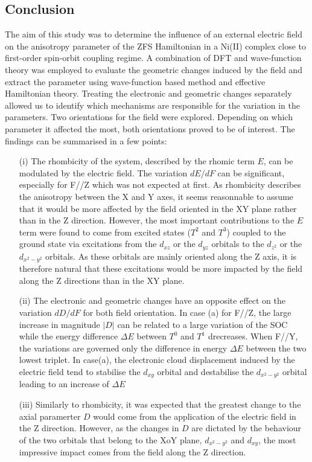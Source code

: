 \documentclass[10pt]{report}
\numberwithin{equation}{section}
\begin{document}
\newpage
\subsection{Conclusion}

The aim of this study was to determine the influence of an external electric field on the anisotropy parameter of the ZFS Hamiltonian in a Ni(II) complex close to first-order spin-orbit coupling regime. 
A combination of DFT and wave-function theory was employed to evaluate the geometric changes induced by the field and extract the parameter using wave-function based method and effective Hamiltonian theory.
Treating the electronic and geometric changes separately allowed us to identify which mechanisms are responsible for the variation in the parameters.
Two orientations for the field were explored. Depending on which parameter it affected the most, both orientations proved to be of interest.
The findings can be summarised in a few points:

\begin{itemize}
    \item[(i)] The rhombicity of the system, described by the rhomic term $E$, can be modulated by the electric field. 
    The variation $dE/dF$ can be significant, especially for F//Z which was not expected at first.
    As rhombicity describes the anisotropy between the X and Y axes, it seems reasonnable to assume that it would be more affected by the field oriented in the XY plane rather than in the Z direction.
    However, the most important contributions to the $E$ term were found to come from excited states ($T^2$ and $T^3$) coupled to the ground state via excitations from the $d_{xz}$ or the $d_{yz}$ orbitals to the $d_{z^2}$ or the $d_{x^2-y^2}$ orbitals.
    As these orbitals are mainly oriented along the Z axis, it is therefore natural that these excitations would be more impacted by the field along the Z directions than in the XY plane.
    \item[(ii)] The electronic and geometric changes have an opposite effect on the variation $dD/dF$ for both field orientation. 
    In case (a) for F//Z, the large increase in magnitude $|D|$ can be related to a large variation of the SOC while the energy difference $\Delta E$ between $T^0$ and $T^1$ drecreases.
    When F//Y, the variations are governed only the difference in energy $\Delta E$ between the two lowest triplet. 
    In case(a), the electronic cloud displacement induced by the electric field tend to stabilise the $d_{xy}$ orbital and destabilise the $d_{x^2-y^2}$ orbital leading to an increase of $\Delta E$
    \item[(iii)] Similarly to rhombicity, it was expected that the greatest change to the axial paramerter $D$ would come from the application of the electric field in the Z direction.
    However, as the changes in $D$ are dictated by the behaviour of the two orbitals that belong to the XoY plane, $d_{x^2-y^2}$ and $d_{xy}$, the most impressive impact comes from the field along the Z direction.
\end{itemize}
\end{document}

